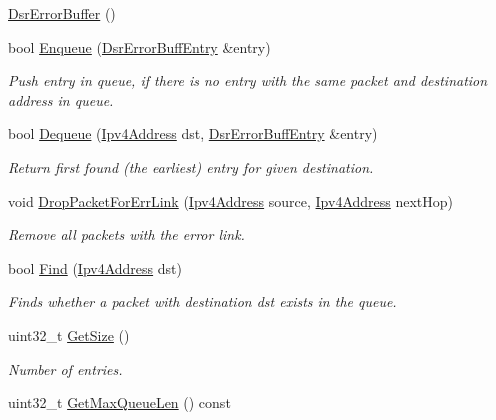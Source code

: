\begin{DoxyCompactItemize}
\item 
\hyperlink{classns3_1_1dsr_1_1DsrErrorBuffer_a6505fb477e2db654470797de5e421853}{Dsr\+Error\+Buffer} ()
\item 
bool \hyperlink{classns3_1_1dsr_1_1DsrErrorBuffer_a509601131629af3b0b4881f88d9b672e}{Enqueue} (\hyperlink{classns3_1_1dsr_1_1DsrErrorBuffEntry}{Dsr\+Error\+Buff\+Entry} \&entry)
\begin{DoxyCompactList}\small\item\em Push entry in queue, if there is no entry with the same packet and destination address in queue. \end{DoxyCompactList}\item 
bool \hyperlink{classns3_1_1dsr_1_1DsrErrorBuffer_a58e0c804871e9834661054edaa8f3f21}{Dequeue} (\hyperlink{classns3_1_1Ipv4Address}{Ipv4\+Address} dst, \hyperlink{classns3_1_1dsr_1_1DsrErrorBuffEntry}{Dsr\+Error\+Buff\+Entry} \&entry)
\begin{DoxyCompactList}\small\item\em Return first found (the earliest) entry for given destination. \end{DoxyCompactList}\item 
void \hyperlink{classns3_1_1dsr_1_1DsrErrorBuffer_a6fc7e8bf24bb1a17c7b5ba809e036584}{Drop\+Packet\+For\+Err\+Link} (\hyperlink{classns3_1_1Ipv4Address}{Ipv4\+Address} source, \hyperlink{classns3_1_1Ipv4Address}{Ipv4\+Address} next\+Hop)
\begin{DoxyCompactList}\small\item\em Remove all packets with the error link. \end{DoxyCompactList}\item 
bool \hyperlink{classns3_1_1dsr_1_1DsrErrorBuffer_a6297a3549b5a22b7a71f7ffe44323b0e}{Find} (\hyperlink{classns3_1_1Ipv4Address}{Ipv4\+Address} dst)
\begin{DoxyCompactList}\small\item\em Finds whether a packet with destination dst exists in the queue. \end{DoxyCompactList}\item 
uint32\+\_\+t \hyperlink{classns3_1_1dsr_1_1DsrErrorBuffer_ab92dc271abcc1543af60225e3bde0469}{Get\+Size} ()
\begin{DoxyCompactList}\small\item\em Number of entries. \end{DoxyCompactList}\item 
uint32\+\_\+t \hyperlink{classns3_1_1dsr_1_1DsrErrorBuffer_a60072c829b9c10c0fdfcd217309452a7}{Get\+Max\+Queue\+Len} () const 

\end{DoxyCompactItemize}
